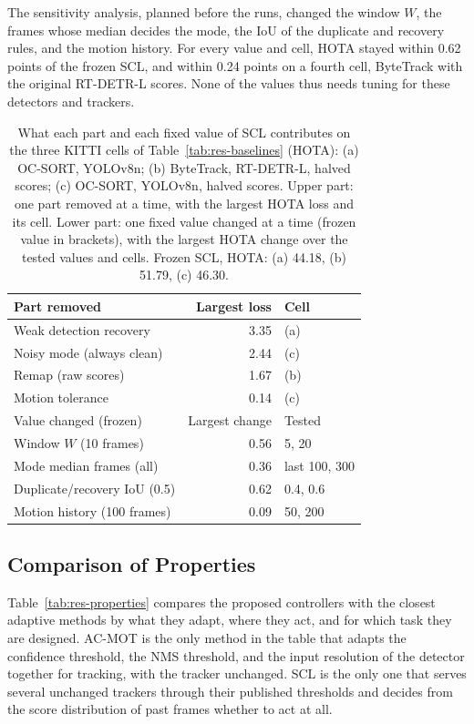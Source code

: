 The sensitivity analysis, planned before the runs, changed the window $W$, the frames whose median decides the mode, the IoU of the duplicate and recovery rules, and the motion history. For every value and cell, HOTA stayed within 0.62 points of the frozen SCL, and within 0.24 points on a fourth cell, ByteTrack with the original RT-DETR-L scores. None of the values thus needs tuning for these detectors and trackers.

\begin{table}[tbp]
\centering
\caption{What each part and each fixed value of SCL contributes on the three KITTI cells of Table~\ref{tab:res-baselines} (HOTA): (a) OC-SORT, YOLOv8n; (b) ByteTrack, RT-DETR-L, halved scores; (c) OC-SORT, YOLOv8n, halved scores. Upper part: one part removed at a time, with the largest HOTA loss and its cell. Lower part: one fixed value changed at a time (frozen value in brackets), with the largest HOTA change over the tested values and cells. Frozen SCL, HOTA: (a) 44.18, (b) 51.79, (c) 46.30.}
\label{tab:res-parts}
\begin{tabular}{lrl}
\toprule
Part removed & Largest loss & Cell\\
\midrule
Weak detection recovery & 3.35 & (a)\\
Noisy mode (always clean) & 2.44 & (c)\\
Remap (raw scores) & 1.67 & (b)\\
Motion tolerance & 0.14 & (c)\\
\midrule
Value changed (frozen) & Largest change & Tested\\
\midrule
Window $W$ (10 frames) & 0.56 & 5, 20\\
Mode median frames (all) & 0.36 & last 100, 300\\
Duplicate/recovery IoU (0.5) & 0.62 & 0.4, 0.6\\
Motion history (100 frames) & 0.09 & 50, 200\\
\bottomrule
\end{tabular}
\end{table}

\subsection{Comparison of Properties}\label{sec:res-properties}
Table~\ref{tab:res-properties} compares the proposed controllers with the closest adaptive methods by what they adapt, where they act, and for which task they are designed. AC-MOT is the only method in the table that adapts the confidence threshold, the NMS threshold, and the input resolution of the detector together for tracking, with the tracker unchanged. SCL is the only one that serves several unchanged trackers through their published thresholds and decides from the score distribution of past frames whether to act at all.

